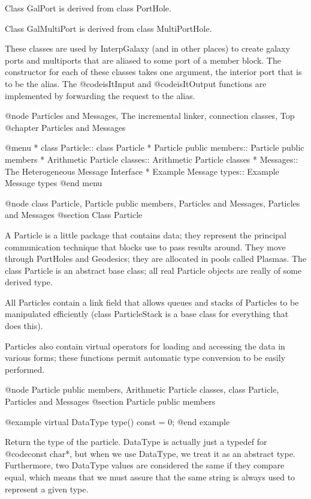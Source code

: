 Class GalPort is derived from class PortHole.

Class GalMultiPort is derived from class MultiPortHole.

These classes are used by InterpGalaxy (and in other places) to create
galaxy ports and multiports that are aliased to some port of a member
block.  The constructor for each of these classes takes one argument,
the interior port that is to be the alias.  The @code{isItInput} and
@code{isItOutput} functions are implemented by forwarding the request
to the alias.

@node Particles and Messages, The incremental linker, connection classes, Top
@chapter Particles and Messages

@menu
* class Particle::              class Particle
* Particle public members::     Particle public members
* Arithmetic Particle classes::  Arithmetic Particle classes
* Messages::                    The Heterogeneous Message Interface
* Example Message types::       Example Message types
@end menu

@node class Particle, Particle public members, Particles and Messages, Particles and Messages
@section Class Particle

A Particle is a little package that contains data; they represent the
principal communication technique that blocks use to pass results
around.  They move through PortHoles and Geodesics; they are allocated
in pools called Plasmas.  The class Particle is an abstract base class;
all real Particle objects are really of some derived type.

All Particles contain a link field that allows queues and stacks of
Particles to be manipulated efficiently (class ParticleStack is a base
class for everything that does this).

Particles also contain virtual operators for loading and accessing the
data in various forms; these functions permit automatic type conversion
to be easily performed.

@node Particle public members, Arithmetic Particle classes, class Particle, Particles and Messages
@section Particle public members

@example
virtual DataType type() const = 0;
@end example

Return the type of the particle.  DataType is actually just a typedef
for @code{const char*}, but when we use DataType, we treat it as an
abstract type.  Furthermore, two DataType values are considered the
same if they compare equal, which means that we must assure that
the same string is always used to represent a given type.

